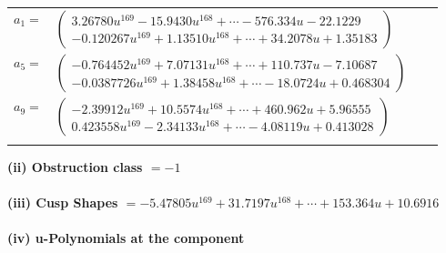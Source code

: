 \documentclass[1p]{elsarticle_modified}
\theoremstyle{definition}
\begin{document}
\begin{tabular}{m{7pt} m{180pt} m{7pt} m{180pt} }
\flushright $a_{1}=$&$\begin{pmatrix}3.26780 u^{169}-15.9430 u^{168}+\cdots-576.334 u-22.1229\\-0.120267 u^{169}+1.13510 u^{168}+\cdots+34.2078 u+1.35183\end{pmatrix}$ \\
\flushright $a_{5}=$&$\begin{pmatrix}-0.764452 u^{169}+7.07131 u^{168}+\cdots+110.737 u-7.10687\\-0.0387726 u^{169}+1.38458 u^{168}+\cdots-18.0724 u+0.468304\end{pmatrix}$ \\
\flushright $a_{9}=$&$\begin{pmatrix}-2.39912 u^{169}+10.5574 u^{168}+\cdots+460.962 u+5.96555\\0.423558 u^{169}-2.34133 u^{168}+\cdots-4.08119 u+0.413028\end{pmatrix}$\\&\end{tabular}
\flushleft \textbf{(ii) Obstruction class $= -1$}\\~\\
\flushleft \textbf{(iii) Cusp Shapes $= -5.47805 u^{169}+31.7197 u^{168}+\cdots+153.364 u+10.6916$}\\~\\
\newpage\renewcommand{\arraystretch}{1}
\flushleft \textbf{(iv) u-Polynomials at the component}\newline \\
\end{document}
